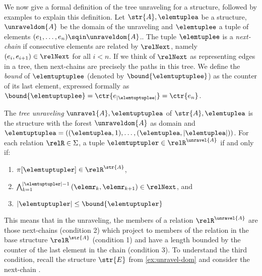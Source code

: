 \noindent
We now give a formal definition of the tree unraveling for a structure, followed by examples to explain this definition.
Let $\str{A}, \elemtuplea$ be a structure, $\unraveldom{A}$ be the domain of the unraveling and $\elemtuplee$ a tuple of elements $(e_{1}, \ldots, e_{n}) \sqin \unraveldom{A}$..
The tuple $\elemtuplee$ is a \emph{next-chain} if consecutive elements are related by $\relNext$, namely $(e_{i}, e_{i+1}) \in \relNext$ for all $i < n$.
If we think of $\relNext$ as representing edges in a tree, then next-chains are precisely the paths in this tree.
We define the \emph{bound} of $\elemtuptuplee$ (denoted by $\bound{\elemtuptuplee}$) as the counter of its last element, expressed formally as $\bound{\elemtuptuplee} = \ctr{e_{|\elemtuptuplee|}} = \ctr{e_{n}}$.
\begin{definition}
The \emph{tree unraveling} $\unravel{A}, \elemtuptuplea$ of $\str{A}, \elemtuplea$ is the structure with the forest $\unraveldom{A}$ as domain and $\elemtuptuplea = ((\elemtuplea, 1), \ldots, (\elemtuplea, |\elemtuplea|))$.
For each relation $\relR \in \Sigma$, a tuple $\elemtuptupler \in \relR^{\unravel{A}}$ if and only if:
\begin{enumerate}
  \item $\pi[\elemtuptupler] \in \relR^{\str{A}}$,
  \item $\bigwedge_{k=1}^{|\elemtuptupler|-1}{(\elemr_{k},\elemr_{k+1}) \in \relNext}$, and
  \item $|\elemtuptupler| \le \bound{\elemtuptupler}$
\end{enumerate}
\end{definition}
This means that in the unraveling, the members of a relation $\relR^{\unravel{A}}$ are those next-chains (condition 2) which project to members of the relation in the base structure $\relR^{\str{A}}$ (condition 1) and have a length bounded by the counter of the last element in the chain (condition 3).
To understand the third condition, recall the structure $\str{E}$ from \cref{ex:unravel-dom} and consider the next-chain .
